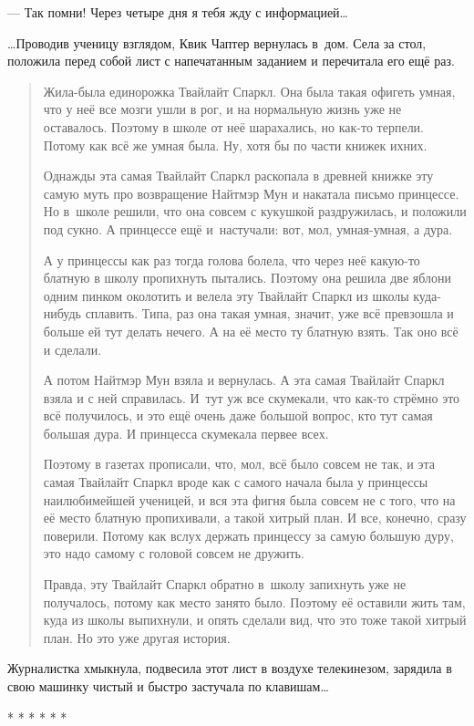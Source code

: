 \documentclass[fontsize=11pt,a5paper,titlepage=firstcover]{scrbook}
\begin{document}
--- Так помни! Через четыре дня я тебя жду с информацией{\ldots}

{\ldots}Проводив ученицу взглядом, Квик Чаптер вернулась в~дом. Села за стол, положила перед собой лист с напечатанным заданием и перечитала его ещё раз.
\begin{quotation}
Жила-была единорожка Твайлайт Спаркл. Она была такая офигеть умная, что у неё все мозги ушли в рог, и на нормальную жизнь уже не оставалось. Поэтому в школе от неё шарахались, но как-то терпели. Потому как всё же умная была. Ну, хотя бы по части книжек ихних.

Однажды эта самая Твайлайт Спаркл раскопала в древней книжке эту самую муть про возвращение Найтмэр Мун и накатала письмо принцессе. Но в~школе решили, что она совсем с кукушкой раздружилась, и положили под сукно. А принцессе ещё и~настучали: вот, мол, умная-умная, а дура.

А у принцессы как раз тогда голова болела, что через неё какую-то блатную в школу пропихнуть пытались. Поэтому она решила две яблони одним пинком околотить и велела эту Твайлайт Спаркл из школы куда-нибудь сплавить. Типа, раз она такая умная, значит, уже всё превзошла и больше ей тут делать нечего. А на её место ту блатную взять. Так оно всё и сделали.

А потом Найтмэр Мун взяла и вернулась. А эта самая Твайлайт Спаркл взяла и с ней справилась. И~тут уж все скумекали, что как-то стрёмно это всё получилось, и это ещё очень даже большой вопрос, кто тут самая большая дура. И принцесса скумекала первее всех.

Поэтому в газетах прописали, что, мол, всё было совсем не так, и эта самая Твайлайт Спаркл вроде как с самого начала была у принцессы наилюбимейшей ученицей, и вся эта фигня была совсем не с того, что на её место блатную пропихивали, а такой хитрый план. И все, конечно, сразу поверили. Потому как вслух держать принцессу за самую большую дуру, это надо самому с головой совсем не дружить.

Правда, эту Твайлайт Спаркл обратно в~школу запихнуть уже не получалось, потому как место занято было. Поэтому её оставили жить там, куда из школы выпихнули, и опять сделали вид, что это тоже такой хитрый план. Но это уже другая история.
\end{quotation}
Журналистка хмыкнула, подвесила этот лист в воздухе телекинезом, зарядила в свою машинку чистый и быстро застучала по клавишам{\ldots}
\begin{center}* * * * * *\end{center}
\end{document}
